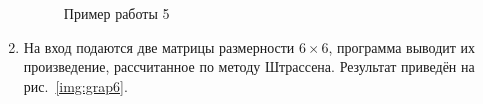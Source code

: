 \documentclass[12pt, a4paper]{article}
\begin{document}
\begin{enumerate}
\begin{figure}[h]
  		\caption{Пример работы 5}
  		\label{img:grap5}
	\end{figure}
	\newpage
	\item На вход подаются две матрицы размерности $6 \times 6$, 
	программа выводит их произведение, рассчитанное по методу Штрассена.
	Результат приведён на рис.~\ref{img:grap6}.	
	\begin{figure}[h]

\end{figure}
\end{enumerate}
\end{document}
